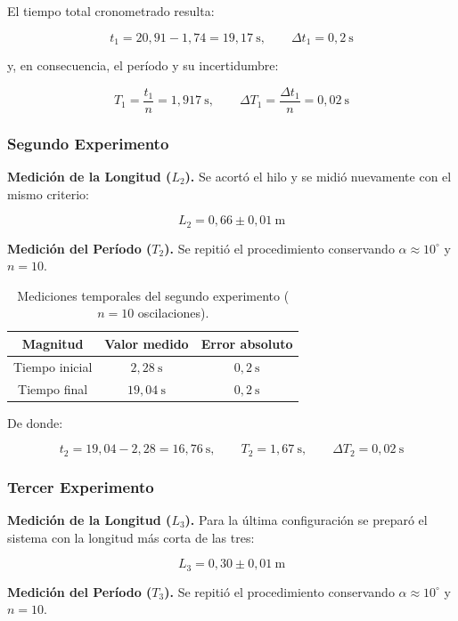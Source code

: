 El tiempo total cronometrado resulta:

\[
t_1 = 20{,}91 - 1{,}74 = 19{,}17\ \mathrm{s}, \qquad \Delta t_1 = 0{,}2\ \mathrm{s}
\]

y, en consecuencia, el período y su incertidumbre:

\[
T_1 = \frac{t_1}{n} = 1{,}917\ \mathrm{s},
\qquad
\Delta T_1 = \frac{\Delta t_1}{n} = 0{,}02\ \mathrm{s}
\]

\subsubsection{Segundo Experimento}

\textbf{Medición de la Longitud ($L_2$).} Se acortó el hilo y se midió nuevamente con el mismo criterio:

\[
L_2 = 0{,}66 \pm 0{,}01\ \mathrm{m}
\]

\textbf{Medición del Período ($T_2$).} Se repitió el procedimiento conservando $\alpha \approx 10^\circ$ y $n = 10$.

\begin{table}[h!]
\centering
\begin{tabular}{|c|c|c|}
\hline
\textbf{Magnitud} & \textbf{Valor medido} & \textbf{Error absoluto} \\ \hline
Tiempo inicial   & $2{,}28\ \mathrm{s}$  & $0{,}2\ \mathrm{s}$  \\ \hline
Tiempo final     & $19{,}04\ \mathrm{s}$ & $0{,}2\ \mathrm{s}$  \\ \hline
\end{tabular}
\caption{Mediciones temporales del segundo experimento ($n = 10$ oscilaciones).}
\end{table}

De donde:

\[
t_2 = 19{,}04 - 2{,}28 = 16{,}76\ \mathrm{s},
\qquad
T_2 = 1{,}67\ \mathrm{s},
\qquad
\Delta T_2 = 0{,}02\ \mathrm{s}
\]

\subsubsection{Tercer Experimento}

\textbf{Medición de la Longitud ($L_3$).} Para la última configuración se preparó el sistema con la longitud más corta de las tres:

\[
L_3 = 0{,}30 \pm 0{,}01\ \mathrm{m}
\]

\textbf{Medición del Período ($T_3$).} Se repitió el procedimiento conservando $\alpha \approx 10^\circ$ y $n = 10$.

